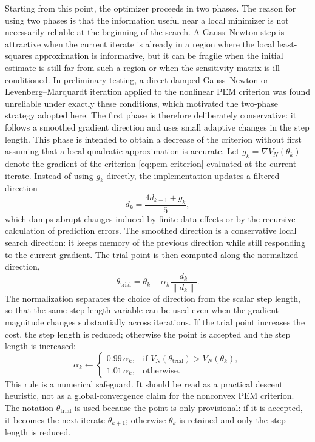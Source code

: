 \documentclass{ifacconf}
\begin{document}
Starting from this point, the optimizer proceeds in two phases.  The reason for
using two phases is that the information useful near a local minimizer is not
necessarily reliable at the beginning of the search.  A Gauss--Newton step is
attractive when the current iterate is already in a region where the local
least-squares approximation is informative, but it can be fragile when the
initial estimate is still far from such a region or when the sensitivity matrix
is ill conditioned.  In preliminary testing, a direct damped Gauss--Newton or
Levenberg--Marquardt iteration applied to the nonlinear PEM criterion was found
unreliable under exactly these conditions, which motivated the two-phase strategy
adopted here.  The first phase is therefore deliberately conservative: it
follows a smoothed gradient direction and uses small adaptive changes in the step
length.  This phase is intended to obtain a decrease of the criterion without
first assuming that a local quadratic approximation is accurate.  Let
\(g_k = \nabla V_N(\theta_k)\) denote the gradient of the criterion
\eqref{eq:pem-criterion} evaluated at the current iterate.  Instead of using
\(g_k\) directly, the implementation updates a filtered direction
\begin{equation}
  d_k = \frac{4d_{k-1}+g_k}{5},
  \label{eq:direction-filter}
\end{equation}
which damps abrupt changes induced by finite-data effects or by the recursive
calculation of prediction errors.  The smoothed direction is a conservative
local search direction: it keeps memory of the previous direction while still
responding to the current gradient.  The trial point is then computed along the
normalized direction,
\begin{equation}
  \theta_{\mathrm{trial}}
  = \theta_k - \alpha_k\frac{d_k}{\lVert d_k\rVert}.
  \label{eq:gradient-step}
\end{equation}
The normalization separates the choice of direction from the scalar step
length, so that the same step-length variable can be used even when the gradient
magnitude changes substantially across iterations.  If the trial point
increases the cost, the step length is reduced; otherwise the point is accepted
and the step length is increased:
\begin{equation}
  \alpha_k \leftarrow
  \begin{cases}
    0.99\,\alpha_k, & \text{if } V_N(\theta_{\mathrm{trial}}) > V_N(\theta_k), \\
    1.01\,\alpha_k, & \text{otherwise}.
  \end{cases}
  \label{eq:step-adapt}
\end{equation}
This rule is a numerical safeguard.  It
should be read as a practical descent heuristic, not as a global-convergence
claim for the nonconvex PEM criterion.  The notation
\(\theta_{\mathrm{trial}}\) is used because the point is only provisional: if it
is accepted, it becomes the next iterate \(\theta_{k+1}\); otherwise
\(\theta_k\) is retained and only the step length is reduced.
\end{document}
